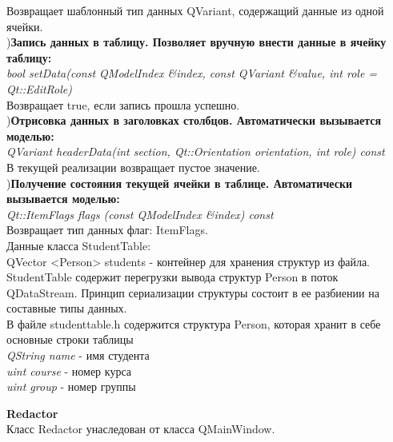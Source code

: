 \documentclass[a4paper]{article}
\begin{document}
{	     \hfill\break
	     Возвращает шаблонный тип данных QVariant, содержащий данные из одной ячейки.\\
	     \hfill\break
	     \hfill{}){\bf Запись данных в таблицу. Позволяет вручную внести данные в ячейку таблицу:}\\
	     \hfill\break
	     \textit{bool setData(const QModelIndex \&index, const QVariant \&value, int role = Qt::EditRole)}\\
	     \hfill\break
	     Возвращает true, если запись прошла успешно.\\
	     \hfill\break
	     \hfill{}){\bf Отрисовка данных в заголовках столбцов. Автоматически вызывается моделью:}\\
	     \hfill\break
	     \textit{QVariant headerData(int section, Qt::Orientation orientation, int role) const}\\
	     \hfill\break
	     В текущей реализации возвращает пустое значение.\\
	     \hfill\break
	     \hfill{}){\bf Получение состояния текущей ячейки в таблице. Автоматически вызывается моделью:}\\    
	     \hfill\break
	     \textit{Qt::ItemFlags flags (const QModelIndex \&index) const}\\
	     \hfill\break
	     Возвращает тип данных флаг: ItemFlags.\\
	     \hfill\break
	     \hfill\break
	     Данные класса StudentTable:\\
	     \hfill\break
	     QVector <Person> students - контейнер для хранения структур из файла.\\
	     \hfill\break
	     StudentTable содержит перегрузки вывода структур Person в поток QDataStream. Принцип сериализации структуры состоит в ее разбиении на составные типы данных.\\
	     \hfill\break
	     \hfill\break   
	В файле studenttable.h содержится структура Person, которая хранит в себе основные строки таблицы\\
	    \hfill \break
	    \textit{QString name} - имя студента\\
	    \textit{uint course} - номер курса\\        
	    \textit{uint group} - номер группы\\
        \hfill\break
        \hfill\break 
        
 {\LARGE \bf Redactor}\\
        \hfill\break
        Класс Redactor унаследован от класса QMainWindow.\\
        \hfill\break
        
}
\end{document}
